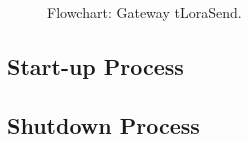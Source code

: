\begin{figure}[H]
	\centering
	\caption{Flowchart: Gateway tLoraSend.}
	\label{fig:gwtLoraSend}
\end{figure}


\subsection{Start-up Process}

\subsection{Shutdown Process}
